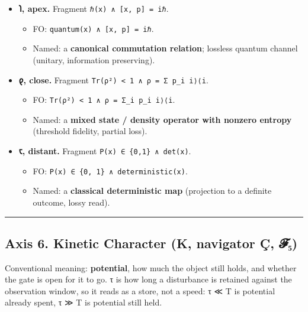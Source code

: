 \begin{itemize}
\tightlist
\item
  \textbf{𐑐, apex.} Fragment \texttt{ℏ(x)\ ∧\ {[}x,\ p{]}\ =\ iℏ}.

  \begin{itemize}
  \tightlist
  \item
    FO: \texttt{quantum(x)\ ∧\ {[}x,\ p{]}\ =\ iℏ}.
  \item
    Named: a \textbf{canonical commutation relation}; lossless quantum
    channel (unitary, information preserving).
  \end{itemize}
\item
  \textbf{𐑞, close.} Fragment
  \texttt{Tr(ρ²)\ \textless{}\ 1\ ∧\ ρ\ =\ Σ\ p\_i\ \textbar{}i⟩⟨i\textbar{}}.

  \begin{itemize}
  \tightlist
  \item
    FO:
    \texttt{Tr(ρ²)\ \textless{}\ 1\ ∧\ ρ\ =\ Σ\_i\ p\_i\ \textbar{}i⟩⟨i\textbar{}}.
  \item
    Named: a \textbf{mixed state / density operator with nonzero
    entropy} (threshold fidelity, partial loss).
  \end{itemize}
\item
  \textbf{𐑱, distant.} Fragment \texttt{P(x)\ ∈\ \{0,1\}\ ∧\ det(x)}.

  \begin{itemize}
  \tightlist
  \item
    FO: \texttt{P(x)\ ∈\ \{0,\ 1\}\ ∧\ deterministic(x)}.
  \item
    Named: a \textbf{classical deterministic map} (projection to a
    definite outcome, lossy read).
  \end{itemize}
\end{itemize}

\begin{center}\rule{0.5\linewidth}{0.5pt}\end{center}

\hypertarget{axis-6.-kinetic-character-k-navigator-uxe7-ux1d4d5ux2085}{%
\subsection{Axis 6. Kinetic Character (K, navigator Ç,
𝓕₅)}\label{axis-6.-kinetic-character-k-navigator-uxe7-ux1d4d5ux2085}}

Conventional meaning: \textbf{potential}, how much the object still
holds, and whether the gate is open for it to go. τ is how long a
disturbance is retained against the observation window, so it reads as a
store, not a speed: τ ≪ T is potential already spent, τ ≫ T is potential
still held.

